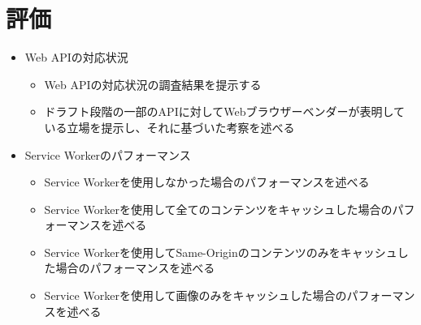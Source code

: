 \section{評価}\label{section:評価}
\begin{itemize}
  \item Web APIの対応状況
  \begin{itemize}
    \item Web APIの対応状況の調査結果を提示する
    \item ドラフト段階の一部のAPIに対してWebブラウザーベンダーが表明している立場を提示し、それに基づいた考察を述べる
  \end{itemize}
  \item Service Workerのパフォーマンス
  \begin{itemize}
    \item Service Workerを使用しなかった場合のパフォーマンスを述べる
    \item Service Workerを使用して全てのコンテンツをキャッシュした場合のパフォーマンスを述べる
    \item Service Workerを使用してSame-Originのコンテンツのみをキャッシュした場合のパフォーマンスを述べる
    \item Service Workerを使用して画像のみをキャッシュした場合のパフォーマンスを述べる
  \end{itemize}
\end{itemize}